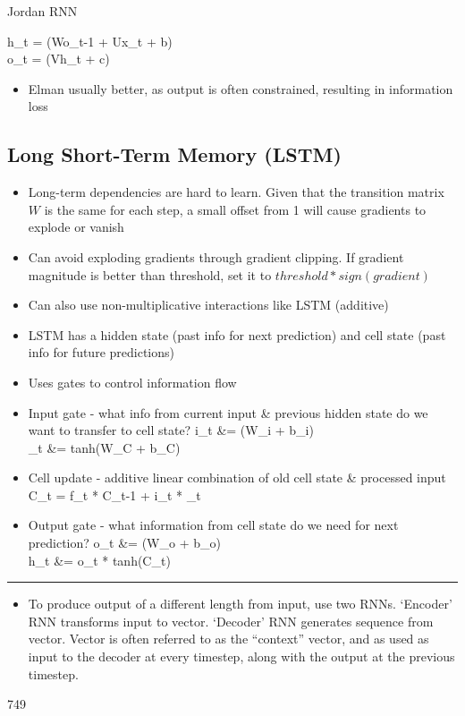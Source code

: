\documentclass[12pt]{article}
\newcommand{\divider}[0]{\par\textcolor{lightgray}{\rule{\textwidth}{0.1pt}}}
\newenvironment{eqn}{\equation\alignedat{3}}{\endalignedat\endequation}
\begin{document}
Jordan RNN

\begin{eqn}
	h_t = \sigma(Wo_{t-1} + Ux_t + b) \\ 
	o_t = \phi(Vh_t + c)
\end{eqn}

\begin{itemize}
	\item Elman usually better, as output is often constrained, resulting in information loss
\end{itemize}

\subsection{Long Short-Term Memory (LSTM)}

\begin{itemize}
	\item Long-term dependencies are hard to learn. Given that the transition matrix $W$ is the same for each step, a small offset from 1 will cause gradients to explode or vanish
	\item Can avoid exploding gradients through gradient clipping. If gradient magnitude is better than threshold, set it to $threshold * sign(gradient)$
	\item Can also use non-multiplicative interactions like LSTM (additive)
	\item LSTM has a hidden state (past info for next prediction) and cell state (past info for future predictions)
	\item Uses gates to control information flow 
	\item Input gate - what info from current input \& previous hidden state do we want to transfer to cell state?
	\begin{eqn}
		i_t &= \sigma(W_i \cdot \left[ h_{t-1}, x_t \right] + b_i) \\ 
		_t &= tanh(W_C \cdot \left[ h_{t-1}, x_t \right] + b_C)
	\end{eqn}
	\item Cell update - additive linear combination of old cell state \& processed input 
	\begin{eqn}
		C_t = f_t * C_{t-1} + i_t * _t
	\end{eqn}
	\item Output gate - what information from cell state do we need for next prediction? 
	\begin{eqn}
		o_t &= \sigma(W_o \left[ h_{t-1}, x_t \right] + b_o) \\
		h_t &= o_t * tanh(C_t)
	\end{eqn}
\end{itemize}

\divider 

\begin{itemize}
	\item To produce output of a different length from input, use two RNNs. `Encoder' RNN transforms input to vector. `Decoder' RNN generates sequence from vector. Vector is often referred to as the ``context'' vector, and as used as input to the decoder at every timestep, along with the output at the previous timestep.
\end{itemize}

749
\end{document}
